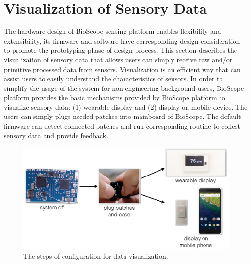 



\section{Visualization of Sensory Data}
The hardware design of BioScope sensing platform enables flexibility and extensibility, its firmware and software have corresponding design consideration to promote the prototyping phase of design process. This section describes the visualization of sensory data that allows users can simply receive raw and/or primitive processed data from sensors. Visualization is an efficient way that can assist users to easily understand the characteristics of sensors. 
In order to simplify the usage of the system for non-engineering background users, BioScope platform provides the basic mechanisms provided by BioScope platform to visualize sensory data: (1) wearable display and (2) display on mobile device. The users can simply plugs needed patches into mainboard of BioScope. The default firmware can detect connected patches and run corresponding routine to collect sensory data and provide feedback.

\begin{figure}
\centering
\includegraphics[width=14cm]{image/fig_config.ps}
\caption{The steps of configuration for data visualization.}
\label{fig_config}
\end{figure}

